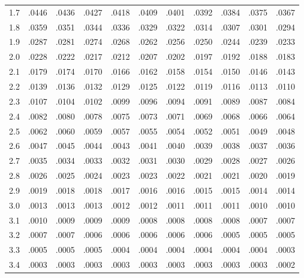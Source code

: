 \documentclass[12pt,a4paper]{article}
\makeatletter
\renewenvironment{table}[1][]{%
 \ifthenelse{\equal{#1}{}}{%
   \@float{table}
 }{%
   \@float{table}[#1]%
 }%
 \centering
}{%
 \end@float
}
\makeatother
\begin{document}
\begin{table}[!htbp]
\begin{tabularx}{\textwidth}{ c|CCCCCCCCCC}
1.7 & .0446 &  .0436 &  .0427 &  .0418 &  .0409 &  .0401 &  .0392 &  .0384 &  .0375 &  .0367 \\
1.8 & .0359 &  .0351 &  .0344 &  .0336 &  .0329 &  .0322 &  .0314 &  .0307 &  .0301 &  .0294 \\
1.9 & .0287 &  .0281 &  .0274 &  .0268 &  .0262 &  .0256 &  .0250 &  .0244 &  .0239 &  .0233 \\
2.0 & .0228 &  .0222 &  .0217 &  .0212 &  .0207 &  .0202 &  .0197 &  .0192 &  .0188 &  .0183 \\
2.1 & .0179 &  .0174 &  .0170 &  .0166 &  .0162 &  .0158 &  .0154 &  .0150 &  .0146 &  .0143 \\
2.2 & .0139 &  .0136 &  .0132 &  .0129 &  .0125 &  .0122 &  .0119 &  .0116 &  .0113 &  .0110 \\
2.3 & .0107 &  .0104 &  .0102 &  .0099 &  .0096 &  .0094 &  .0091 &  .0089 &  .0087 &  .0084 \\
2.4 & .0082 &  .0080 &  .0078 &  .0075 &  .0073 &  .0071 &  .0069 &  .0068 &  .0066 &  .0064 \\
2.5 & .0062 &  .0060 &  .0059 &  .0057 &  .0055 &  .0054 &  .0052 &  .0051 &  .0049 &  .0048 \\
2.6 & .0047 &  .0045 &  .0044 &  .0043 &  .0041 &  .0040 &  .0039 &  .0038 &  .0037 &  .0036 \\
2.7 & .0035 &  .0034 &  .0033 &  .0032 &  .0031 &  .0030 &  .0029 &  .0028 &  .0027 &  .0026 \\
2.8 & .0026 &  .0025 &  .0024 &  .0023 &  .0023 &  .0022 &  .0021 &  .0021 &  .0020 &  .0019 \\
2.9 & .0019 &  .0018 &  .0018 &  .0017 &  .0016 &  .0016 &  .0015 &  .0015 &  .0014 &  .0014 \\
3.0 & .0013 &  .0013 &  .0013 &  .0012 &  .0012 &  .0011 &  .0011 &  .0011 &  .0010 &  .0010 \\
3.1 & .0010 &  .0009 &  .0009 &  .0009 &  .0008 &  .0008 &  .0008 &  .0008 &  .0007 &  .0007 \\
3.2 & .0007 &  .0007 &  .0006 &  .0006 &  .0006 &  .0006 &  .0006 &  .0005 &  .0005 &  .0005 \\
3.3 & .0005 &  .0005 &  .0005 &  .0004 &  .0004 &  .0004 &  .0004 &  .0004 &  .0004 &  .0003 \\
3.4 & .0003 &  .0003 &  .0003 &  .0003 &  .0003 &  .0003 &  .0003 &  .0003 &  .0003 &  .0002 \\
    \end{tabularx}  
    \caption{Right-Tail Probabilities under the Normal Distribution}
    \label{tbl:normal}
\end{table}
\FloatBarrier
\end{document}

